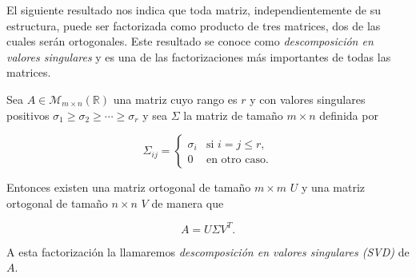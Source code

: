 El siguiente resultado nos indica que toda matriz, independientemente de su estructura, puede ser factorizada como producto de tres matrices, dos de las cuales serán ortogonales. Este resultado se conoce como \emph{descomposición en valores singulares} y es una de las factorizaciones más importantes de todas las matrices.
\begin{teorema}
    Sea $A \in \mathcal{M}_{m \times n}(\mathbb{R})$ una matriz cuyo rango es $r$ y con valores singulares positivos $\sigma_{1} \geq \sigma_{2} \geq \cdots \geq \sigma_{r}$ y sea $\Sigma$ la matriz de tamaño $m \times n$ definida por 

    \[
        \Sigma_{ij} =
        \begin{cases}
            \sigma_i & \text{si } i = j \leq r, \\
            0 & \text{en otro caso.}
        \end{cases}
    \]

    Entonces existen una matriz ortogonal de tamaño $m \times m$ $U$ y una matriz ortogonal de tamaño $n \times n$ $V$ de manera que

    \[
        A = U \Sigma V^{T}.
    \]

    A esta factorización la llamaremos \emph{descomposición en valores singulares (SVD)} de $A$.\newline
\end{teorema}

